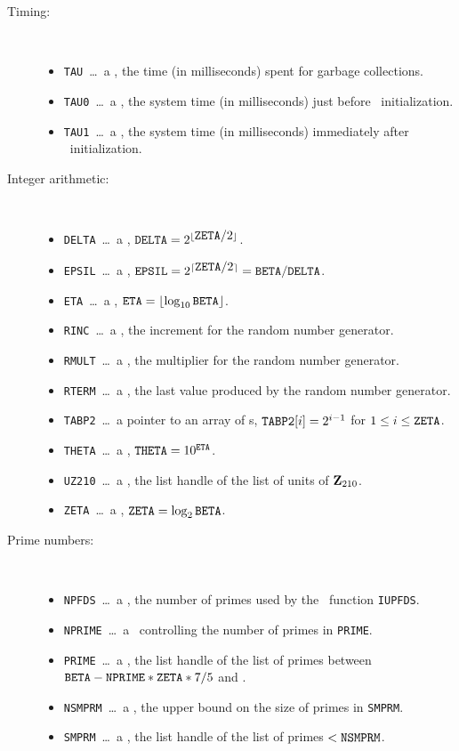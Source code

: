 \begin{description}
\item[Timing:] \ \
  \begin{itemize}
  \item {\tt TAU}\ \ldots\ a \Word, the time (in milliseconds) spent for
    garbage collections.
  \item {\tt TAU0}\ \ldots\ a \Word, the system time (in milliseconds) just
    before \saclib\ initialization.
  \item {\tt TAU1}\ \ldots\ a \Word, the system time (in milliseconds)
    immediately after \saclib\ initialization.
  \end{itemize}

\item[Integer arithmetic:] \ \
  \begin{itemize}
  \item {\tt DELTA}\ \ldots\ a \Word, ${\tt DELTA} = 2^{\lfloor{\textstyle
    {\tt ZETA}/2}\rfloor}$.
  \item {\tt EPSIL}\ \ldots\ a \Word, ${\tt EPSIL} = 2^{\lceil{\textstyle
    {\tt ZETA}/2}\rceil} = {\tt BETA}/{\tt DELTA}$.
  \item {\tt ETA}\ \ldots\ a \Word, ${\tt ETA} = \lfloor\log_{10} {\tt BETA}
    \rfloor$.
  \item {\tt RINC}\ \ldots\ a \Word, the increment for the random number
    generator.
  \item {\tt RMULT}\ \ldots\ a \Word, the multiplier for the random number
    generator.
  \item {\tt RTERM}\ \ldots\ a \Word, the last value produced by the random
    number generator.
  \item {\tt TABP2}\ \ldots\ a pointer to an array of \Word s,
    ${\tt TABP2}[i] = 2^{i-1}$ for $1 \leq i \leq {\tt ZETA}$.
  \item {\tt THETA}\ \ldots\ a \Word, ${\tt THETA} = 10^{\tt ETA}$.
  \item {\tt UZ210}\ \ldots\ a \Word, the list handle of the list of units
    of ${\bf Z}_{210}$.
  \item {\tt ZETA}\ \ldots\ a \Word, ${\tt ZETA} = \log_2 {\tt BETA}$.
  \end{itemize}

\item[Prime numbers:] \ \
  \begin{itemize}
  \item {\tt NPFDS}\ \ldots\ a \Word, the number of primes used by the
    \saclib\ function {\tt IUPFDS}.
  \item {\tt NPRIME}\ \ldots\ a \Word\ controlling the number of primes in
    {\tt PRIME}.
  \item {\tt PRIME}\ \ldots\ a \Word, the list handle of the list of primes
    between ${\tt BETA} - {\tt NPRIME} * {\tt ZETA} * 7 / 5$ and \BETA.
  \item {\tt NSMPRM}\ \ldots\ a \Word, the upper bound on the size of primes
    in {\tt SMPRM}.
  \item {\tt SMPRM}\ \ldots\ a \Word, the list handle of the list of primes
    $< {\tt NSMPRM}$.
  \end{itemize}


\end{description}
